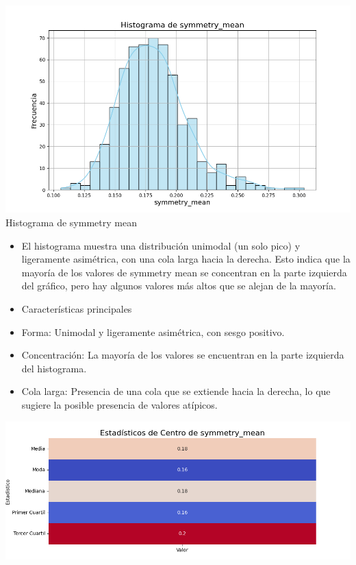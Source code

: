 \documentclass[a4paper, 12pt]{article}
\begin{document}
	\includegraphics[width=\textwidth]{../Plots/plots_stats/symmetry_mean/histograma_symmetry_mean.png}
Histograma de symmetry mean
\begin{itemize}
\item El histograma muestra una distribución unimodal (un solo pico) y ligeramente asimétrica, con una cola larga hacia la derecha. Esto indica que la mayoría de los valores de symmetry mean se concentran en la parte izquierda del gráfico, pero hay algunos valores más altos que se alejan de la mayoría.

\item Características principales

\item Forma: Unimodal y ligeramente asimétrica, con sesgo positivo.
\item Concentración: La mayoría de los valores se encuentran en la parte izquierda del histograma.
\item Cola larga: Presencia de una cola que se extiende hacia la derecha, lo que sugiere la posible presencia de valores atípicos.
\end{itemize}

\includegraphics[width=\textwidth]{../Plots/plots_stats/symmetry_mean/estadisticas_centro_symmetry_mean.png}
\end{document}
